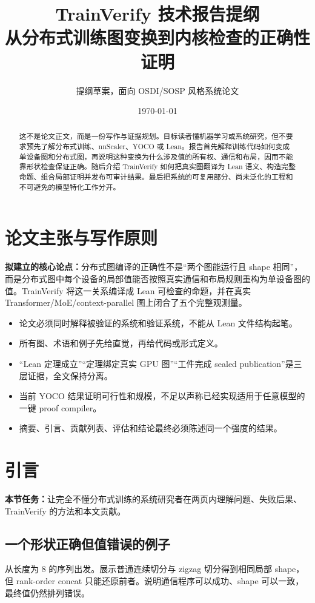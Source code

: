 \documentclass[11pt,a4paper]{ctexart}
\title{TrainVerify 技术报告提纲\\\large 从分布式训练图变换到内核检查的正确性证明}
\author{提纲草案，面向 OSDI/SOSP 风格系统论文}
\date{\today}
\newcommand{\contract}[1]{\par\smallskip\noindent\colorbox{light}{\parbox{0.95\linewidth}{\textbf{本节任务：}#1}}\par\smallskip}
\newcommand{\claimbox}[1]{\par\noindent\textbf{拟建立的核心论点：}#1\par}
\begin{document}
\maketitle

\begin{abstract}
这不是论文正文，而是一份写作与证据规划。目标读者懂机器学习或系统研究，但不要求预先了解分布式训练、nnScaler、YOCO 或 Lean。报告首先解释训练代码如何变成单设备图和分布式图，再说明这种变换为什么涉及值的所有权、通信和布局，因而不能靠形状检查保证正确。随后介绍 TrainVerify 如何把真实图翻译为 Lean 语义、构造完整命题、组合局部证明并发布可审计结果。最后把系统的可复用部分、尚未泛化的工程和不可避免的模型特化工作分开。
\end{abstract}

\section*{论文主张与写作原则}

\claimbox{分布式图编译的正确性不是“两个图能运行且 shape 相同”，而是分布式图中每个设备的局部值能否按照真实通信和布局规则重构为单设备图的值。TrainVerify 将这一关系编译成 Lean 可检查的命题，并在真实 Transformer/MoE/context-parallel 图上闭合了五个完整观测量。}

\begin{itemize}
  \item 论文必须同时解释被验证的系统和验证系统，不能从 Lean 文件结构起笔。
  \item 所有图、术语和例子先给直觉，再给代码或形式定义。
  \item “Lean 定理成立”“定理绑定真实 GPU 图”“工件完成 sealed publication”是三层证据，全文保持分离。
  \item 当前 YOCO 结果证明可行性和规模，不足以声称已经实现适用于任意模型的一键 proof compiler。
  \item 摘要、引言、贡献列表、评估和结论最终必须陈述同一个强度的结果。
\end{itemize}

\section{引言}
\contract{让完全不懂分布式训练的系统研究者在两页内理解问题、失败后果、TrainVerify 的方法和本文贡献。}

\subsection{一个形状正确但值错误的例子}
从长度为 8 的序列出发。展示普通连续切分与 zigzag 切分得到相同局部 shape，但 rank-order concat 只能还原前者。说明通信程序可以成功、shape 可以一致，最终值仍然排列错误。
\end{document}
